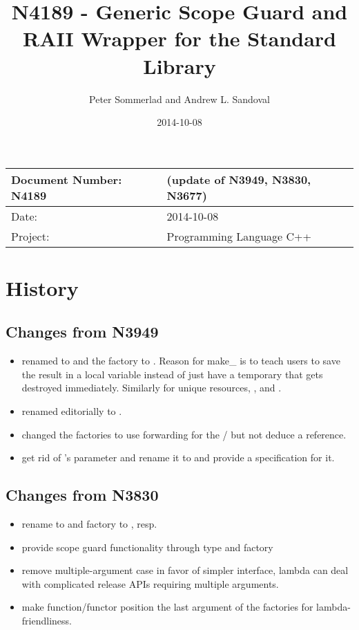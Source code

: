 \documentclass[ebook,11pt,article]{memoir}
\title{N4189 - Generic Scope Guard and RAII Wrapper for the Standard Library}
\author{Peter Sommerlad and Andrew L. Sandoval}
\date{2014-10-08}                                           %
\begin{document}
\maketitle
\begin{tabular}[t]{|l|l|}\hline 
Document Number: N4189 &   (update of N3949, N3830, N3677)\\\hline
Date: & 2014-10-08 \\\hline
Project: & Programming Language C++\\\hline 
\end{tabular}

\chapter{History}
\section{Changes from N3949}
\begin{itemize}
\item renamed  to  and the factory to . Reason for make_ is to teach users to save the result in a local variable instead of just have a temporary that gets destroyed immediately. Similarly for unique resources, ,  and .
\item renamed editorially  to .
\item changed the factories to use forwarding for the / but not deduce a reference.
\item get rid of 's parameter and rename it to  and provide a  specification for it.
\end{itemize}


\section{Changes from N3830}
\begin{itemize}
\item rename to  and factory to , resp. 
\item provide scope guard functionality through type  and  factory
\item remove multiple-argument case in favor of simpler interface, lambda can deal with complicated release APIs requiring multiple arguments.
\item make function/functor position the last argument of the factories for lambda-friendliness.

\end{itemize}
\end{document}
